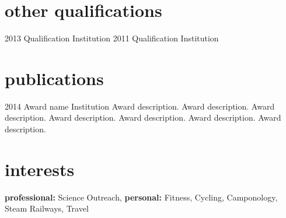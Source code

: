 \documentclass[]{cv-style}          %
\begin{document}

\section{other qualifications}

\begin{entrylist}
\entry
{2013}
{Qualification}
{Institution}
{\vspace{-0.3cm}}
\entry
{2011}
{Qualification}
{Institution}
{\vspace{-0.3cm}}
\end{entrylist}


\section{publications}

\begin{entrylist}
\entry
{2014}
{Award name}
{Institution}
{Award description. Award description. Award description. Award description. Award description. Award description. Award description. }
\end{entrylist}


\section{interests}
  \vspace{-0.2cm}

\textbf{professional:} Science Outreach, 
\textbf{personal:} Fitness, Cycling, Camponology, Steam Railways, Travel

\end{document}
